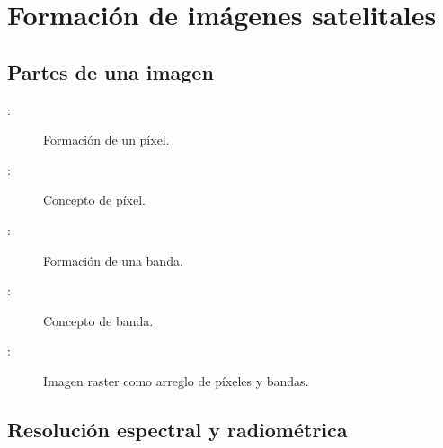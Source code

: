 \section{Formación de imágenes satelitales}
\subsection{Partes de una imagen}

\begin{frame}{\secname : \subsecname}
  \begin{figure}
    \centering
    \caption{Formación de un píxel.}
    \label{}
  \end{figure}
\end{frame}

\begin{frame}{\secname : \subsecname}
  \begin{figure}
    \centering
    \caption{Concepto de píxel.}
    \label{}
  \end{figure}
\end{frame}

\begin{frame}{\secname : \subsecname}
  \begin{figure}
    \centering
    \caption{Formación de una banda.}
    \label{}
  \end{figure}
\end{frame}

\begin{frame}{\secname : \subsecname}
  \begin{figure}
    \centering
    \caption{Concepto de banda.}
    \label{}
  \end{figure}
\end{frame}

\begin{frame}{\secname : \subsecname}
  \begin{figure}
    \centering
    \caption{Imagen raster como arreglo de píxeles y bandas.}
    \label{}
  \end{figure}
\end{frame}

\subsection{Resolución espectral y radiométrica}

